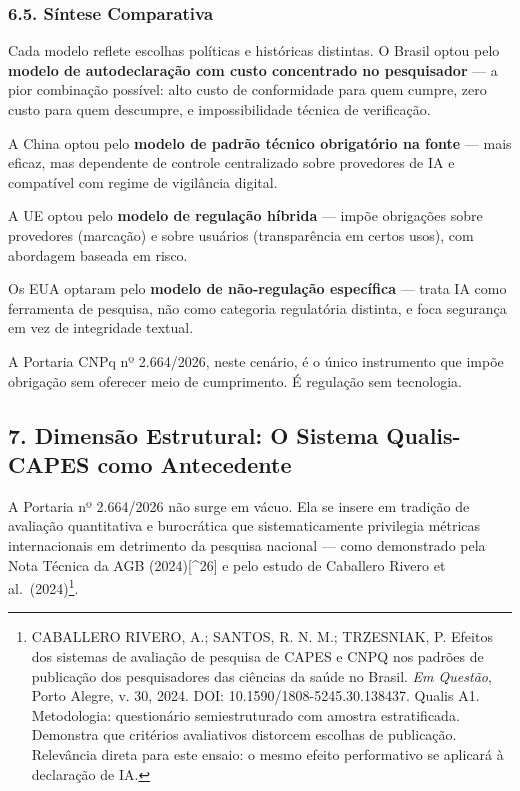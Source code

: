 \documentclass[
  12pt,
  a4paper,
  brazil
]{article}
\begin{document}
\subsubsection{6.5. Síntese Comparativa}\label{suxedntese-comparativa}

Cada modelo reflete escolhas políticas e históricas distintas. O Brasil
optou pelo \textbf{modelo de autodeclaração com custo concentrado no
pesquisador} --- a pior combinação possível: alto custo de conformidade
para quem cumpre, zero custo para quem descumpre, e impossibilidade
técnica de verificação.

A China optou pelo \textbf{modelo de padrão técnico obrigatório na
fonte} --- mais eficaz, mas dependente de controle centralizado sobre
provedores de IA e compatível com regime de vigilância digital.

A UE optou pelo \textbf{modelo de regulação híbrida} --- impõe
obrigações sobre provedores (marcação) e sobre usuários (transparência
em certos usos), com abordagem baseada em risco.

Os EUA optaram pelo \textbf{modelo de não-regulação específica} ---
trata IA como ferramenta de pesquisa, não como categoria regulatória
distinta, e foca segurança em vez de integridade textual.

A Portaria CNPq nº 2.664/2026, neste cenário, é o único instrumento que
impõe obrigação sem oferecer meio de cumprimento. É regulação sem
tecnologia.

\subsection{7. Dimensão Estrutural: O Sistema Qualis-CAPES como
Antecedente}\label{dimensuxe3o-estrutural-o-sistema-qualis-capes-como-antecedente}

A Portaria nº 2.664/2026 não surge em vácuo. Ela se insere em tradição
de avaliação quantitativa e burocrática que sistematicamente privilegia
métricas internacionais em detrimento da pesquisa nacional --- como
demonstrado pela Nota Técnica da AGB (2024){[}\^{}26{]} e pelo estudo de
Caballero Rivero et al.~(2024)\footnote{CABALLERO RIVERO, A.; SANTOS, R.
  N. M.; TRZESNIAK, P. Efeitos dos sistemas de avaliação de pesquisa de
  CAPES e CNPQ nos padrões de publicação dos pesquisadores das ciências
  da saúde no Brasil. \emph{Em Questão}, Porto Alegre, v. 30, 2024. DOI:
  10.1590/1808-5245.30.138437. Qualis A1. Metodologia: questionário
  semiestruturado com amostra estratificada. Demonstra que critérios
  avaliativos distorcem escolhas de publicação. Relevância direta para
  este ensaio: o mesmo efeito performativo se aplicará à declaração de
  IA.}.
\end{document}
